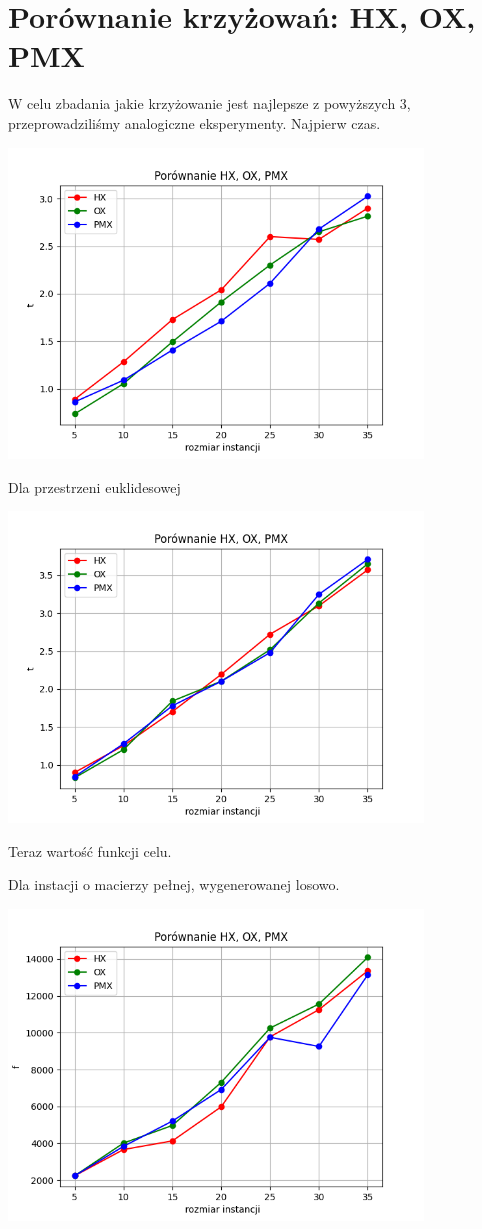\documentclass{article}
\begin{document}
    \section{Porównanie krzyżowań: HX, OX, PMX}

     W celu zbadania jakie krzyżowanie jest najlepsze z
    powyższych 3, przeprowadziliśmy analogiczne eksperymenty.
    Najpierw czas.

     \includegraphics[width=11cm]{../spr3img/Figure_4.png}

    Dla przestrzeni euklidesowej

    \includegraphics[width=11cm]{../spr3img/Figure_4EUC.png}

    Teraz wartość funkcji celu.

    Dla instacji o macierzy pełnej, wygenerowanej losowo.

    \includegraphics[width=11cm]{../spr3img/Figure_3FULL.png}
\end{document}
